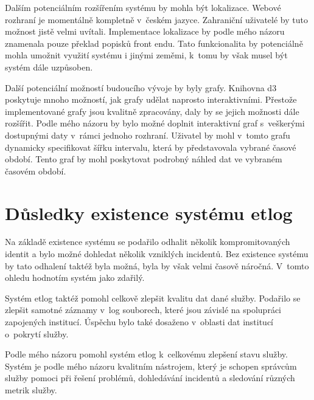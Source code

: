 \documentclass[thesis=M,czech]{FITthesis}[2012/06/26]
\begin{document}
\begin{conclusion}
    Dalším potenciálním rozšířením systému by mohla být lokalizace.
    Webové rozhraní je momentálně kompletně v~českém jazyce.
    Zahraniční uživatelé by tuto možnost jistě velmi uvítali.
    Implementace lokalizace by podle mého názoru znamenala
    pouze překlad popisků front endu.
    Tato funkcionalita by potenciálně mohla umožnit využití systému i jinými zeměmi,
    k~tomu by však musel být systém dále uzpůsoben.

    Další potenciální možností budoucího vývoje by byly grafy.
    Knihovna d3 poskytuje mnoho možností, jak grafy udělat naprosto interaktivními.
    Přestože implementované grafy jsou kvalitně zpracovány, daly by se jejich možnosti dále rozšířit.
    Podle mého názoru by bylo možné doplnit interaktivní graf s~veškerými dostupnými daty
    v~rámci jednoho rozhraní.
    Uživatel by mohl v~tomto grafu dynamicky specifikovat šířku intervalu, která by představovala vybrané časové období.
    Tento graf by mohl poskytovat podrobný náhled dat ve vybraném časovém období.

  \section{Důsledky existence systému etlog}

    Na základě existence systému se podařilo odhalit několik kompromitovaných
    identit a bylo možné dohledat několik vzniklých incidentů.
    Bez existence systému by tato odhalení taktéž byla možná,
    byla by však velmi časově náročná.
    V~tomto ohledu hodnotím systém jako zdařilý.

    Systém etlog taktéž pomohl celkově zlepšit kvalitu dat dané služby.
    Podařilo se zlepšit samotné záznamy v~log souborech,
    které jsou závislé na spolupráci zapojených institucí.
    Úspěchu bylo také dosaženo v~oblasti dat institucí o~pokrytí služby.
    
    Podle mého názoru pomohl systém etlog k~celkovému zlepšení stavu služby.
    Systém je podle mého názoru kvalitním nástrojem,
    který je schopen správcům služby pomoci při řešení
    problémů, dohledávání incidentů a sledování různých metrik služby.

\end{conclusion}



\nocite{eduroam_caletka_ytb}
\nocite{rfc3748}
\nocite{db_ranking}
\nocite{rfc4017}
\nocite{rfc4234}
\nocite{db_comparsion}
\nocite{rfc2865}
\nocite{rfc2869}
\nocite{cisco_blog}
\nocite{express}
\nocite{radsec_whitepaper}
\nocite{lets_radsec}
\end{document}
